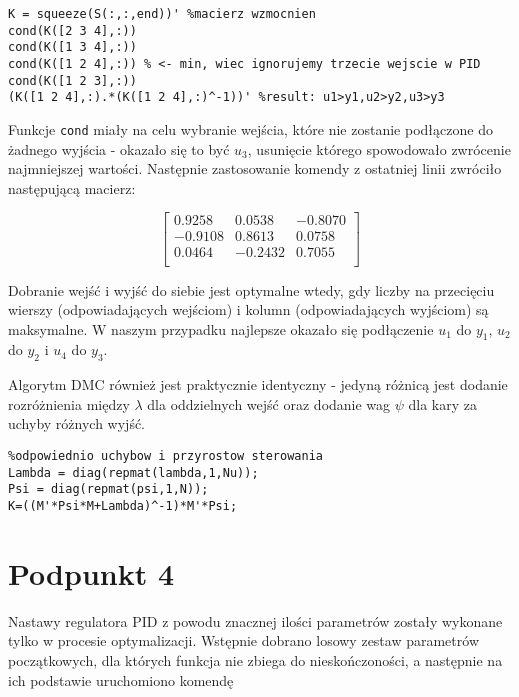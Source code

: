 \begin{lstlisting}[style=Matlab-editor]
K = squeeze(S(:,:,end))' %macierz wzmocnien
cond(K([2 3 4],:))
cond(K([1 3 4],:))
cond(K([1 2 4],:)) % <- min, wiec ignorujemy trzecie wejscie w PID
cond(K([1 2 3],:))
(K([1 2 4],:).*(K([1 2 4],:)^-1))' %result: u1>y1,u2>y2,u3>y3
\end{lstlisting}

Funkcje \verb|cond| miały na celu wybranie wejścia, które nie zostanie podłączone do żadnego wyjścia - okazało się to być $ u_3 $, usunięcie którego spowodowało zwrócenie najmniejszej wartości. Następnie zastosowanie komendy z ostatniej linii zwróciło następującą macierz:

\begin{equation}
\begin{bmatrix}
0.9258 &   0.0538 &  -0.8070 \\
-0.9108 &   0.8613 &   0.0758 \\
0.0464 &  -0.2432 &   0.7055 \\
\end{bmatrix}
\end{equation}

Dobranie wejść i wyjść do siebie jest optymalne wtedy, gdy liczby na przecięciu wierszy (odpowiadających wejściom) i kolumn (odpowiadających wyjściom) są maksymalne. W naszym przypadku najlepsze okazało się podłączenie $ u_1 $ do $ y_1 $, $ u_2 $ do $ y_2 $ i $ u_4 $ do $ y_3 $.

\bigskip

Algorytm DMC również jest praktycznie identyczny - jedyną różnicą jest dodanie rozróżnienia między $ \lambda $ dla oddzielnych wejść oraz dodanie wag $ \psi $ dla kary za uchyby różnych wyjść.

\begin{lstlisting}[style=Matlab-editor]
%lambda i psi to wektory zawierajace kolejne współczynniki kar
%odpowiednio uchybow i przyrostow sterowania
Lambda = diag(repmat(lambda,1,Nu));
Psi = diag(repmat(psi,1,N));
K=((M'*Psi*M+Lambda)^-1)*M'*Psi;
\end{lstlisting}


\chapter{Podpunkt 4}

Nastawy regulatora PID z powodu znacznej ilości parametrów zostały wykonane tylko w procesie optymalizacji. Wstępnie dobrano losowy zestaw parametrów początkowych, dla których funkcja nie zbiega do nieskończoności, a następnie na ich podstawie uruchomiono komendę

